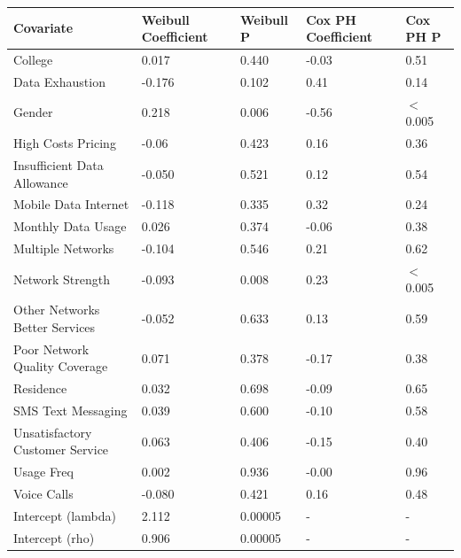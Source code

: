 \documentclass[12pt]{report} %
\begin{document}
\begin{table}[H]
\centering
\begin{tabular}{|l|p{2cm}|p{1.5cm}|p{2cm}|p{1.5cm}|} \hline 
\textbf{Covariate} & \textbf{Weibull Coefficient}& \textbf{Weibull P}& \textbf{Cox PH Coefficient}& \textbf{Cox PH P}\\ \hline 

College & 0.017 & 0.440 & -0.03 & 0.51 \\ \hline 
Data Exhaustion & -0.176 & 0.102 & 0.41 & 0.14 \\ \hline 
Gender & 0.218 & 0.006 & -0.56 & \(<\)0.005 \\ \hline 
High Costs Pricing & -0.06 & 0.423 & 0.16 & 0.36 \\ \hline 
Insufficient Data Allowance & -0.050 & 0.521 & 0.12 & 0.54 \\ \hline 
Mobile Data Internet & -0.118 & 0.335 & 0.32 & 0.24 \\ \hline 
Monthly Data Usage & 0.026 & 0.374 & -0.06 & 0.38 \\ \hline 
Multiple Networks & -0.104 & 0.546 & 0.21 & 0.62 \\ \hline 
Network Strength & -0.093 & 0.008 & 0.23 & \(<\)0.005 \\ \hline 
Other Networks Better Services & -0.052 & 0.633 & 0.13 & 0.59 \\ \hline 
Poor Network Quality Coverage & 0.071 & 0.378 & -0.17 & 0.38 \\ \hline 
Residence & 0.032 & 0.698 & -0.09 & 0.65 \\ \hline 
SMS Text Messaging & 0.039 & 0.600 & -0.10 & 0.58 \\ \hline 
Unsatisfactory Customer Service & 0.063 & 0.406 & -0.15 & 0.40 \\ \hline 
Usage Freq & 0.002 & 0.936 & -0.00 & 0.96 \\ \hline 
Voice Calls & -0.080 & 0.421 & 0.16 & 0.48 \\ \hline 
Intercept (lambda) & 2.112 & 0.00005 & - & - \\
Intercept (rho) & 0.906 & 0.00005 & - & - \\
\hline \hline
\end{tabular}


\end{table}
\end{document}
